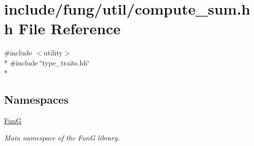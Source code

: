 \hypertarget{compute__sum_8hh}{\section{include/fung/util/compute\-\_\-sum.hh File Reference}
\label{compute__sum_8hh}
}
{\ttfamily \#include $<$utility$>$}\\*
{\ttfamily \#include \char`\"{}type\-\_\-traits.\-hh\char`\"{}}\\*
\subsection*{Namespaces}
\begin{DoxyCompactItemize}
\item 
\hyperlink{namespaceFunG}{Fun\-G}
\begin{DoxyCompactList}\small\item\em Main namespace of the Fun\-G library. \end{DoxyCompactList}\end{DoxyCompactItemize}
